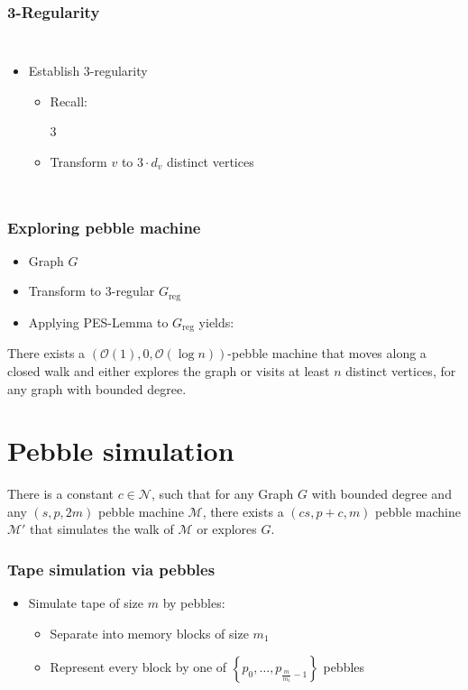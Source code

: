 \documentclass{beamer}
\begin{document}
\begin{frame}
  \frametitle{3-Regularity}
  \begin{columns}
    \begin{itemize}
      \item Establish 3-regularity
        \begin{itemize}
          \item Recall: \parbox{3\baselineskip}{\resizebox{!}
            {3\baselineskip}{}}
          \item<2-> Transform $v$ to $3\cdot d_{v}$ distinct vertices
        \end{itemize}
    \end{itemize}
  \end{columns}
\end{frame}

\begin{frame}
  \frametitle{Exploring pebble machine}
  \begin{itemize}
    \item Graph $G$
    \item Transform to 3-regular $G_{\text{reg}}$
    \item Applying PES-Lemma to $G_{\text{reg}}$ yields:
  \end{itemize}
  \begin{theorem}
    There exists a $(\mathcal{O}(1), 0, \mathcal{O}(\log n))$-pebble machine
    that moves along a closed walk and either explores the graph or visits at
    least $n$ distinct vertices, for any graph with bounded degree.
  \end{theorem}
\end{frame}

\section{Pebble simulation}
\begin{frame}
  \begin{theorem}
    There is a constant $c\in\mathcal{N}$, such that for any Graph $G$
    with bounded degree and any $(s,p,2m)$ pebble machine $\mathcal{M}$, there
    exists a $(cs,p+c,m)$ pebble machine $\mathcal{M}'$ that simulates the walk
    of $\mathcal{M}$ or explores $G$.
  \end{theorem}
\end{frame}

\begin{frame}
  \frametitle{Tape simulation via pebbles}
  \begin{itemize}
    \item Simulate tape of size $m$ by pebbles:
      \begin{itemize}
        \item<3-> Separate into memory blocks of size $m_{1}$
        \item<4-> Represent every block by one of $\left\{p_{0},\dots,p_{\frac{m}{m_{1}}-1}\right\}$ pebbles
      \end{itemize}
  \end{itemize}
\end{frame}
\end{document}
